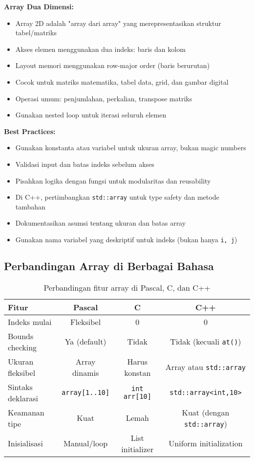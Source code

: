 \documentclass[../main.tex]{subfiles}
\begin{document}
\textbf{Array Dua Dimensi:}
\begin{itemize}
  \item Array 2D adalah "array dari array" yang merepresentasikan struktur tabel/matriks
  \item Akses elemen menggunakan dua indeks: baris dan kolom
  \item Layout memori menggunakan row-major order (baris berurutan)
  \item Cocok untuk matriks matematika, tabel data, grid, dan gambar digital
  \item Operasi umum: penjumlahan, perkalian, transpose matriks
  \item Gunakan nested loop untuk iterasi seluruh elemen
\end{itemize}

\textbf{Best Practices:}
\begin{itemize}
  \item Gunakan konstanta atau variabel untuk ukuran array, bukan magic numbers
  \item Validasi input dan batas indeks sebelum akses
  \item Pisahkan logika dengan fungsi untuk modularitas dan reusability
  \item Di C++, pertimbangkan \texttt{std::array} untuk type safety dan metode tambahan
  \item Dokumentasikan asumsi tentang ukuran dan batas array
  \item Gunakan nama variabel yang deskriptif untuk indeks (bukan hanya \texttt{i, j})
\end{itemize}

\subsection{Perbandingan Array di Berbagai Bahasa}

\begin{table}[h]
\centering
\begin{tabular}{|l|c|c|c|}
\hline
\textbf{Fitur} & \textbf{Pascal} & \textbf{C} & \textbf{C++} \\
\hline
Indeks mulai & Fleksibel & 0 & 0 \\
\hline
Bounds checking & Ya (default) & Tidak & Tidak (kecuali \texttt{at()}) \\
\hline
Ukuran fleksibel & Array dinamis & Harus konstan & Array atau \texttt{std::array} \\
\hline
Sintaks deklarasi & \texttt{array[1..10]} & \texttt{int arr[10]} & \texttt{std::array<int,10>} \\
\hline
Keamanan tipe & Kuat & Lemah & Kuat (dengan \texttt{std::array}) \\
\hline
Inisialisasi & Manual/loop & List initializer & Uniform initialization \\
\hline
\end{tabular}
\caption{Perbandingan fitur array di Pascal, C, dan C++}
\end{table}
\end{document}
